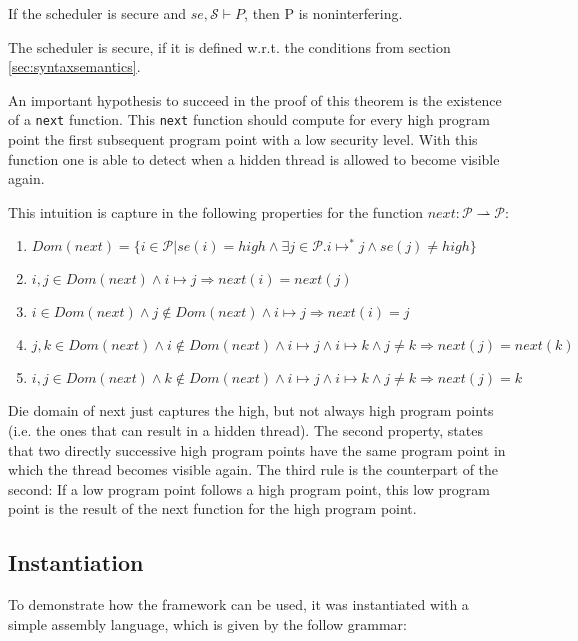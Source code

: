 \documentclass[a4paper,10pt]{llncs}
\begin{document}
\begin{theorem}
If the scheduler is secure and $se, \mathcal{S} \vdash P$, then P is noninterfering.
\end{theorem}

The scheduler is secure, if it is defined w.r.t. the conditions from section \ref{sec:syntaxsemantics}.

An important hypothesis to succeed in the proof of this theorem is the existence
of a \texttt{next} function. This \texttt{next} function should compute for every
high program point the first subsequent program point with a low security level. With
this function one is able to detect when a hidden thread is allowed to become visible
again.

This intuition is capture in the following properties for the function $next: \mathcal{P}
\rightharpoonup \mathcal{P}$:

\begin{enumerate}
\item $Dom(next) = \{i \in \mathcal{P} | se(i) = high \land \exists j \in \mathcal{P} . i \mapsto^* j \land se(j) \neq high\}$ 
\item $i, j \in Dom(next) \land i \mapsto j \Rightarrow next(i) = next(j)$
\item $i \in Dom(next) \land j \not\in Dom(next) \land i \mapsto j \Rightarrow next(i) = j$
\item $j, k \in Dom(next) \land i \not\in Dom(next) \land i \mapsto j \land i \mapsto k \land j \neq k \Rightarrow next(j) = next(k)$ 
\item $i, j \in Dom(next) \land k \not\in Dom(next) \land i \mapsto j \land i \mapsto k \land j \neq k \Rightarrow next(j) = k$
\end{enumerate}

Die domain of next just captures the high, but not always high program points (i.e. the ones
that can result in a hidden thread). The second property, states that two directly successive high
program points have the same program point in which the thread becomes visible again. The third rule
is the counterpart of the second: If a low program point follows a high program point, this low program
point is the result of the next function for the high program point.


\subsection{Instantiation}
\label{sec:instantiation}
To demonstrate how the framework can be used, it was instantiated with a simple
assembly language, which is given by the follow grammar:
\end{document}
